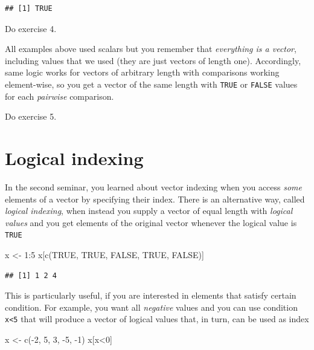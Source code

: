 \documentclass[
]{book}
\newenvironment{Shaded}{\begin{snugshade}}{\end{snugshade}}
\newcommand{\ConstantTok}[1]{\textcolor[rgb]{0.00,0.00,0.00}{#1}}
\newcommand{\DecValTok}[1]{\textcolor[rgb]{0.00,0.00,0.81}{#1}}
\newcommand{\FunctionTok}[1]{\textcolor[rgb]{0.00,0.00,0.00}{#1}}
\newcommand{\NormalTok}[1]{#1}
\newcommand{\OtherTok}[1]{\textcolor[rgb]{0.56,0.35,0.01}{#1}}
\newcommand{\SpecialCharTok}[1]{\textcolor[rgb]{0.00,0.00,0.00}{#1}}
\begin{document}
\begin{verbatim}
## [1] TRUE
\end{verbatim}

Do exercise 4.

All examples above used scalars but you remember that \emph{everything is a vector}, including values that we used (they are just vectors of length one). Accordingly, same logic works for vectors of arbitrary length with comparisons working element-wise, so you get a vector of the same length with \texttt{TRUE} or \texttt{FALSE} values for each \emph{pairwise} comparison.

Do exercise 5.

\hypertarget{logical-indexing}{%
\section{Logical indexing}\label{logical-indexing}}

In the second seminar, you learned about vector indexing when you access \emph{some} elements of a vector by specifying their index. There is an alternative way, called \emph{logical indexing}, when instead you supply a vector of equal length with \emph{logical values} and you get elements of the original vector whenever the logical value is \texttt{TRUE}

\begin{Shaded}
\begin{Highlighting}[]
\NormalTok{x }\OtherTok{\textless{}{-}} \DecValTok{1}\SpecialCharTok{:}\DecValTok{5}
\NormalTok{x[}\FunctionTok{c}\NormalTok{(}\ConstantTok{TRUE}\NormalTok{, }\ConstantTok{TRUE}\NormalTok{, }\ConstantTok{FALSE}\NormalTok{, }\ConstantTok{TRUE}\NormalTok{, }\ConstantTok{FALSE}\NormalTok{)]}
\end{Highlighting}
\end{Shaded}

\begin{verbatim}
## [1] 1 2 4
\end{verbatim}

This is particularly useful, if you are interested in elements that satisfy certain condition. For example, you want all \emph{negative} values and you can use condition \texttt{x\textless{}5} that will produce a vector of logical values that, in turn, can be used as index

\begin{Shaded}
\begin{Highlighting}[]
\NormalTok{x }\OtherTok{\textless{}{-}} \FunctionTok{c}\NormalTok{(}\SpecialCharTok{{-}}\DecValTok{2}\NormalTok{, }\DecValTok{5}\NormalTok{, }\DecValTok{3}\NormalTok{, }\SpecialCharTok{{-}}\DecValTok{5}\NormalTok{, }\SpecialCharTok{{-}}\DecValTok{1}\NormalTok{)}
\NormalTok{x[x}\SpecialCharTok{\textless{}}\DecValTok{0}\NormalTok{]}
\end{Highlighting}
\end{Shaded}
\end{document}
